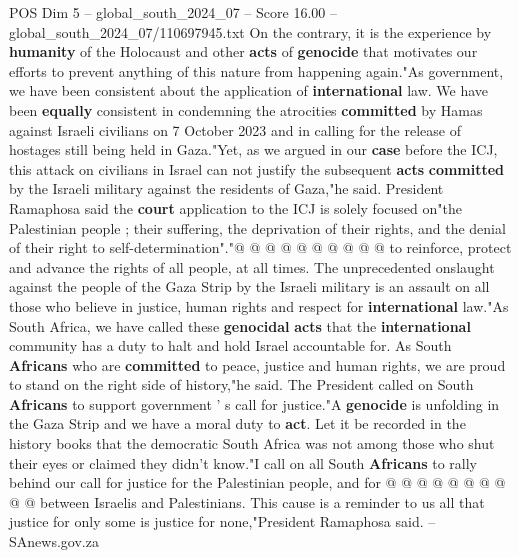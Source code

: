 \begin{textsample}{POS Dim 5 – global\_south\_2024\_07 – Score 16.00 – global\_south\_2024\_07/110697945.txt}
On the contrary, it is the experience by \textbf{humanity} of the Holocaust and other \textbf{acts} of \textbf{genocide} that motivates our efforts to prevent anything of this nature from happening again."As government, we have been consistent about the application of \textbf{international} law.
We have been \textbf{equally} consistent in condemning the atrocities \textbf{committed} by Hamas against Israeli civilians on 7 October 2023 and in calling for the release of hostages still being held in Gaza."Yet, as we argued in our \textbf{case} before the ICJ, this attack on civilians in Israel can not justify the subsequent \textbf{acts} \textbf{committed} by the Israeli military against the residents of Gaza,"he said.
President Ramaphosa said the \textbf{court} application to the ICJ is solely focused on"the Palestinian people ; their suffering, the deprivation of their rights, and the denial of their right to self-determination"."@ @ @ @ @ @ @ @ @ @ to reinforce, protect and advance the rights of all people, at all times.
The unprecedented onslaught against the people of the Gaza Strip by the Israeli military is an assault on all those who believe in justice, human rights and respect for \textbf{international} law."As South Africa, we have called these \textbf{genocidal} \textbf{acts} that the \textbf{international} community has a duty to halt and hold Israel accountable for.
As South \textbf{Africans} who are \textbf{committed} to peace, justice and human rights, we are proud to stand on the right side of history,"he said.
The President called on South \textbf{Africans} to support government ' s call for justice."A \textbf{genocide} is unfolding in the Gaza Strip and we have a moral duty to \textbf{act}.
Let it be recorded in the history books that the democratic South Africa was not among those who shut their eyes or claimed they didn't know."I call on all South \textbf{Africans} to rally behind our call for justice for the Palestinian people, and for @ @ @ @ @ @ @ @ @ @ between Israelis and Palestinians.
This cause is a reminder to us all that justice for only some is justice for none,"President Ramaphosa said. -- SAnews.gov.za

\end{textsample}
